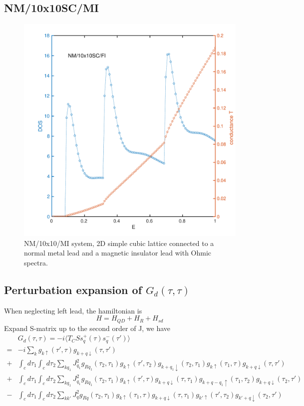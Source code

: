 \documentclass[aps,prb,superscriptaddress]{revtex4-2}
\begin{document}
\subsection{NM/10x10SC/MI}
\begin{figure}[htp!]
\centering
\includegraphics[width=\0.5\textwidth, height=0.4\textwidth]{figures/DOST-NM-FI.pdf}
\caption{NM/10x10/MI system, 2D simple cubic lattice connected to a normal metal lead and a magnetic insulator lead with Ohmic spectra.}
\end{figure}

\subsection{Perturbation expansion of $G_{d}(\tau, \tau)$}

When neglecting left lead, the hamiltonian is
\begin{equation}
H = H_{QD} + H_{R} + H_{sd}
\end{equation}
Expand S-matrix up to the second order of J, we have
\begin{equation}
\begin{split}
&G_{d}(\tau, \tau) = -i\langle T_{C}Ss_{q}^{+}(\tau)s_{q}^{-}(\tau') \rangle \\
=& -i\sum_{k} g_{k\uparrow}(\tau', \tau) g_{k+q\downarrow}(\tau, \tau') \\
+& \int_{c}d\tau_{1}\int_{c}d\tau_{2} \sum_{kq_{1}} J_{q_{1}}^{2} g_{Rq_{1}}(\tau_{2}, \tau_{1}) g_{k\uparrow}(\tau', \tau_{2}) g_{k+q_{1}\downarrow}(\tau_{2}, \tau_{1}) g_{k\uparrow}(\tau_{1}, \tau) g_{k+q\downarrow}(\tau, \tau') \\
+& \int_{c}d\tau_{1}\int_{c}d\tau_{2} \sum_{kq_{1}} J_{q_{1}}^{2} g_{Rq_{1}}(\tau_{2}, \tau_{1}) g_{k\uparrow}(\tau', \tau) g_{k+q\downarrow}(\tau, \tau_{1}) g_{k+q-q_{1}\uparrow}(\tau_{1}, \tau_{2}) g_{k+q\downarrow}(\tau_{2}, \tau') \\
-& \int_{c}d\tau_{1}\int_{c}d\tau_{2} \sum_{kk'} J_{q}^{2} g_{Rq}(\tau_{2}, \tau_{1}) g_{k\uparrow}(\tau_{1}, \tau) g_{k+q\downarrow}(\tau, \tau_{1})  g_{k'\uparrow}(\tau', \tau_{2}) g_{k'+q\downarrow}(\tau_{2}, \tau')
\end{split}
\end{equation}
\end{document}

